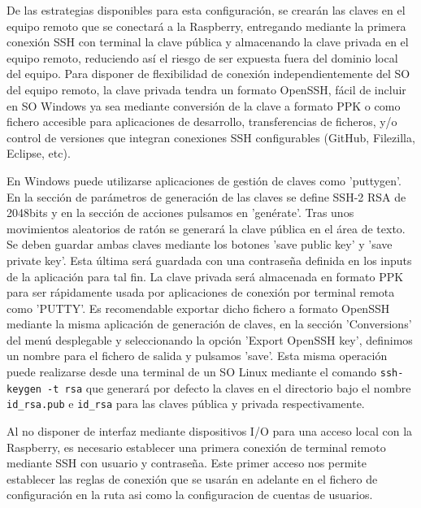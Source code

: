  De las estrategias disponibles para esta configuración, se crearán las claves en el equipo remoto que se conectará a la Raspberry, entregando mediante la primera conexión SSH con terminal la clave pública y almacenando la clave privada en el equipo remoto, reduciendo así el riesgo de ser expuesta fuera del dominio local del equipo. Para disponer de flexibilidad de conexión independientemente del SO del equipo remoto, la clave privada tendra un formato OpenSSH, fácil de incluir en SO Windows ya sea mediante conversión de la clave a formato PPK o como fichero accesible para aplicaciones de desarrollo, transferencias de ficheros, y/o control de versiones que integran conexiones SSH configurables (GitHub, Filezilla, Eclipse, etc).

En Windows puede utilizarse aplicaciones de gestión de claves como 'puttygen'. En la sección de parámetros de generación de las claves se define SSH-2 RSA de 2048bits y en la sección de acciones pulsamos en 'genérate'. Tras unos movimientos aleatorios de ratón se generará la clave pública en el área de texto. Se deben guardar ambas claves mediante los botones 'save public key' y 'save private key'. Esta última será guardada con una contraseña definida en los inputs de la aplicación para tal fin. La clave privada será almacenada en formato PPK para ser rápidamente usada por aplicaciones de conexión por terminal remota como 'PUTTY'. Es recomendable exportar dicho fichero a formato OpenSSH mediante la misma aplicación de generación de claves, en la sección 'Conversions' del menú desplegable y seleccionando la opción 'Export OpenSSH key', definimos un nombre para el fichero de salida y pulsamos 'save'. Esta misma operación puede realizarse desde una terminal de un SO Linux mediante el comando \verb|ssh-keygen -t rsa| que generará por defecto la claves en el directorio  bajo el nombre \verb|id_rsa.pub| e \verb|id_rsa| para las claves pública y privada respectivamente.

Al no disponer de interfaz mediante dispositivos I/O para una acceso local con la Raspberry, es necesario establecer una primera conexión de terminal remoto mediante SSH con usuario y contraseña. Este primer acceso nos permite establecer las reglas de conexión que se usarán en adelante en el fichero de configuración en la ruta  asi como la configuracion de cuentas de usuarios.

